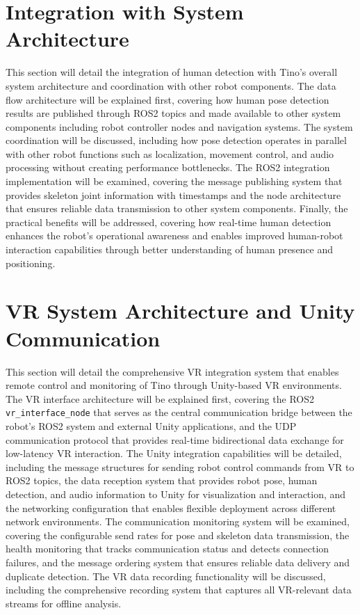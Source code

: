 \section{Integration with System Architecture}
This section will detail the integration of human detection with Tino's overall system architecture and coordination with other robot components. The data flow architecture will be explained first, covering how human pose detection results are published through ROS2 topics and made available to other system components including robot controller nodes and navigation systems. The system coordination will be discussed, including how pose detection operates in parallel with other robot functions such as localization, movement control, and audio processing without creating performance bottlenecks. The ROS2 integration implementation will be examined, covering the message publishing system that provides skeleton joint information with timestamps and the node architecture that ensures reliable data transmission to other system components. Finally, the practical benefits will be addressed, covering how real-time human detection enhances the robot's operational awareness and enables improved human-robot interaction capabilities through better understanding of human presence and positioning.

\section{VR System Architecture and Unity Communication}
This section will detail the comprehensive VR integration system that enables remote control and monitoring of Tino through Unity-based VR environments. The VR interface architecture will be explained first, covering the ROS2 \texttt{vr\_interface\_node} that serves as the central communication bridge between the robot's ROS2 system and external Unity applications, and the UDP communication protocol that provides real-time bidirectional data exchange for low-latency VR interaction. The Unity integration capabilities will be detailed, including the message structures for sending robot control commands from VR to ROS2 topics, the data reception system that provides robot pose, human detection, and audio information to Unity for visualization and interaction, and the networking configuration that enables flexible deployment across different network environments. The communication monitoring system will be examined, covering the configurable send rates for pose and skeleton data transmission, the health monitoring that tracks communication status and detects connection failures, and the message ordering system that ensures reliable data delivery and duplicate detection. The VR data recording functionality will be discussed, including the comprehensive recording system that captures all VR-relevant data streams for offline analysis.

